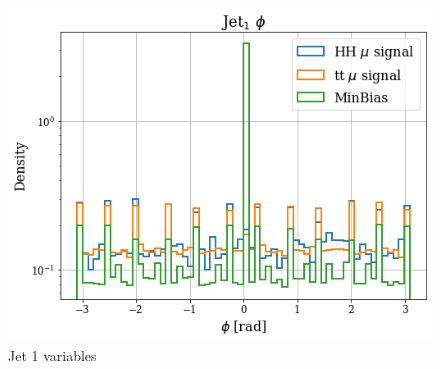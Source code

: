 \documentclass[../main.tex]{subfiles}
\begin{document}
\begin{figure}[!ht]
\begin{minipage}[b]{0.33\linewidth}
    \centering
    \includegraphics[width=1\linewidth]{Chapters/Plots/Hist_1mu_jet1_Phi.png}
  \end{minipage}
  \caption{Jet 1 variables}
 \end{figure}
 
\end{document}

